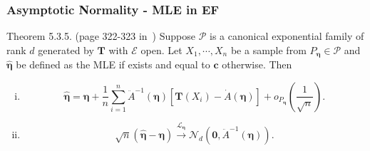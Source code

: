 \documentclass[serif,mathserif,professionalfont]{beamer}
\begin{document}
\begin{frame}
	
	\frametitle{Asymptotic Normality - MLE in EF}
	
	\begin{block}{Theorem 5.3.5. (page 322-323 in~\cite{BD2015})}
		Suppose $ \mathcal{P} $ is a canonical exponential family of rank $ d $ generated by $ \mathbf{T} $ with $ \mathcal{E} $ open. Let $ X_1, \cdots, X_n $ be a sample from $ P_{\boldsymbol{\eta}} \in \mathcal{P} $ and $ \widehat{\boldsymbol{\eta}} $ be defined as the MLE if exists and equal to $ \mathbf{c} $ otherwise. Then 
		\begin{enumerate}[(i)]
			\item 
			\begin{equation*}
			\widehat{\boldsymbol{\eta}} = \boldsymbol{\eta} + \frac{1}{n} \sum_{i=1}^{n} \ddot{A}^{-1}\left(\boldsymbol{\eta} \right) \left[\mathbf{T}\left(X_i \right) - \dot{A}\left(\boldsymbol{\eta} \right) \right] + o_{P_{\boldsymbol{\eta}}}\left(\frac{1}{\sqrt{n}} \right).
			\end{equation*}
			\item 
			\begin{equation*}
			\sqrt{n}\left(\widehat{\boldsymbol{\eta}} - \boldsymbol{\eta} \right) \xrightarrow{\mathcal{L}_{\boldsymbol{\eta}}} \mathcal{N}_d\left(\mathbf{0}, \ddot{A}^{-1}\left(\boldsymbol{\eta} \right) \right).
			\end{equation*}
		\end{enumerate}
	\end{block}
	
\end{frame}
\end{document}
